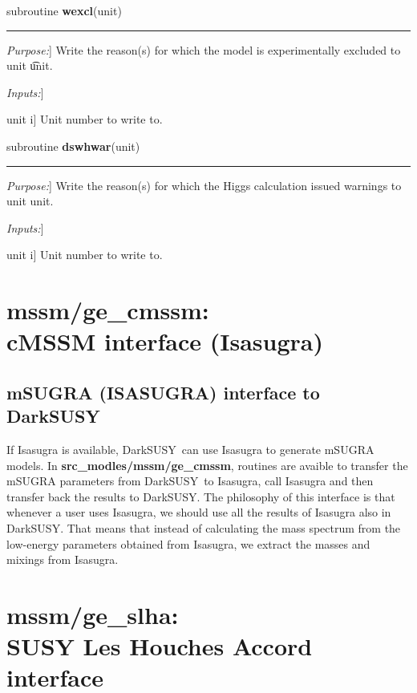\documentclass[a4paper,10pt,oneside]{book}
\newcommand{\code}[1]{\ft{#1}}
\newcommand{\codeb}[1]{\ftb{#1}}
\newcommand{\ds}{{\sffamily DarkSUSY}}
\newenvironment{allsubs}{\begin{list}{}{\setlength{\labelsep}{0.0 cm}
\setlength{\labelwidth}{0.0 cm} \setlength{\leftmargin}{0.0 cm}
\setlength{\itemsep}{0.6ex} \setlength{\topsep}{\itemsep}}}{\end{list}}
\newenvironment{subs}{\begin{list}{}{\setlength{\labelwidth}{2.0 cm}
\setlength{\labelsep}{0.5 cm} \setlength{\leftmargin}{3.0 cm}
\setlength{\itemsep}{0.0 cm} \setlength{\parsep}{0.0 cm}
\setlength{\topsep}{0.0 cm} \setlength{\parskip}{0.0 cm}}}{\end{list}}
\newenvironment{sub}[1]%
{\begin{allsubs}\item \tw{#1\raisebox{-0.5ex}{}}\hrule\begin{subs}}
{\end{subs}\end{allsubs}}
\newcommand{\lft}[1]{\makebox[2.0 cm][l]{\em #1}}   %
\newcommand{\lfv}[1]{\makebox[1.5 cm][l]{\sffamily #1}}   %
\newcommand{\itit}[1]{\item[\lft{#1}]}
\newcommand{\itv}[2]{\item[\lfv{#1 \hfill #2}]}
\newcommand{\tw}[1]{\textsf{#1}}
\newcommand{\ft}[1]{\textsf{#1}}
\newcommand{\ftb}[1]{{\bfseries \sffamily #1}}
\begin{document}
\begin{sub}{subroutine \ftb{wexcl}(unit)}
  \itit{Purpose:} Write the reason(s) for which the model is
  experimentally excluded  to unit \t{unit}.
  \itit{Inputs:}
  \itv{unit}{i} Unit number to write to.
\end{sub}  

\begin{sub}{subroutine \ftb{dswhwar}(unit)}
  \itit{Purpose:} Write the reason(s) for which the Higgs
  calculation issued warnings to unit \ft{unit}.
  \itit{Inputs:}
  \itv{unit}{i} Unit number to write to.
\end{sub}  



\section[mssm/ge\_cmssm: cMSSM interface (Isasugra)]{\codeb{mssm/ge\_cmssm}:\\ cMSSM interface (Isasugra)}
\label{sec:src_models/mssm/ge_cmssm}


\subsection{mSUGRA (ISASUGRA) interface to DarkSUSY}

If \code{Isasugra} is available, \ds\ can use \code{Isasugra} to
generate mSUGRA models. In \codeb{src\_modles/mssm/ge\_cmssm}, routines are avaible to
transfer the mSUGRA parameters from \ds\ to \code{Isasugra}, call
\code{Isasugra} and then transfer back the results to \ds. The
philosophy of this interface is that whenever a user uses
\code{Isasugra}, we should use all the results of \code{Isasugra} also
in \ds. That means that instead of calculating the mass spectrum from
the low-energy parameters obtained from \code{Isasugra}, we extract
the masses and mixings from \code{Isasugra}.

\section[mssm/ge\_slha: SUSY Les Houches Accord interface]{\codeb{mssm/ge\_slha}:\\ SUSY Les Houches Accord interface}
\label{sec:src_models/mssm/ge_slha}
\end{document}
